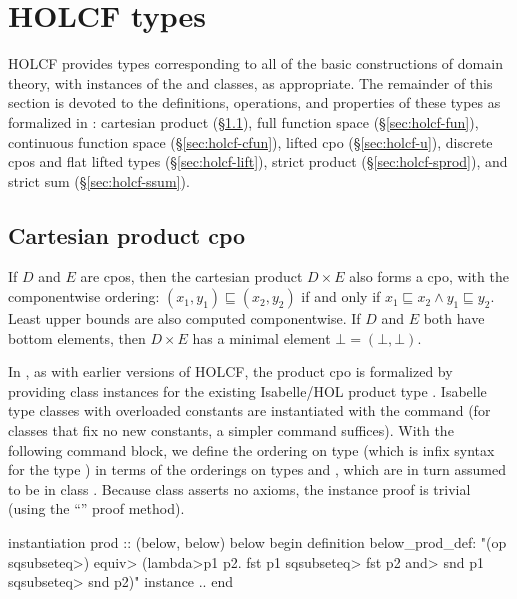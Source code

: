 
\section{HOLCF types}
\label{sec:holcf-types}

HOLCF provides types corresponding to all of the basic constructions of domain theory, with instances of the  and  classes, as appropriate. The remainder of this section is devoted to the definitions, operations, and properties of these types as formalized in : cartesian product (\S\ref{sec:holcf-prod}), full function space (\S\ref{sec:holcf-fun}), continuous function space (\S\ref{sec:holcf-cfun}), lifted cpo (\S\ref{sec:holcf-u}), discrete cpos and flat lifted types (\S\ref{sec:holcf-lift}), strict product (\S\ref{sec:holcf-sprod}), and strict sum (\S\ref{sec:holcf-ssum}).


\subsection{Cartesian product cpo}
\label{sec:holcf-prod}

If $D$ and $E$ are cpos, then the cartesian product $D \times E$ also forms a cpo, with the componentwise ordering: $(x_1, y_1) \sqsubseteq (x_2, y_2)$ if and only if $x_1 \sqsubseteq x_2 \land y_1 \sqsubseteq y_2$. Least upper bounds are also computed componentwise. If $D$ and $E$ both have bottom elements, then $D \times E$ has a minimal element $\bot = (\bot, \bot)$.

In , as with earlier versions of HOLCF, the product cpo is formalized by providing class instances for the existing Isabelle/HOL product type . Isabelle type classes with overloaded constants are instantiated with the  command (for classes that fix no new constants, a simpler  command suffices). With the following  command block, we define the ordering on type  (which is infix syntax for the type ) in terms of the orderings on types  and , which are in turn assumed to be in class . Because class  asserts no axioms, the instance proof is trivial (using the ``'' proof method).

\begin{isacode}
instantiation prod :: (below, below) below
begin
  definition below_prod_def:
    "(op \<sqsubseteq>) \<equiv> (\<lambda>p1 p2. fst p1 \<sqsubseteq> fst p2 \<and> snd p1 \<sqsubseteq> snd p2)"
  instance ..
end
\end{isacode}

